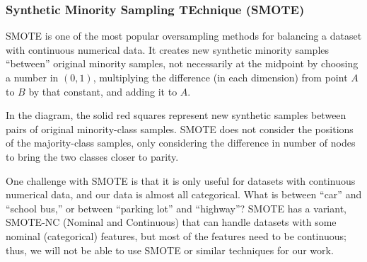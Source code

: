 \subsubsection{Synthetic Minority Sampling TEchnique (SMOTE)}

SMOTE \citep{00017602530000120020101} is one of the most popular oversampling methods for balancing a dataset with continuous numerical data.  It creates new synthetic minority samples ``between'' original minority samples, not necessarily at the midpoint by choosing a number in $(0,1)$, multiplying the difference (in each dimension) from point $A$ to $B$ by that constant, and adding it to $A$.

In the diagram, the solid red squares represent new synthetic samples between pairs of original minority-class samples.  SMOTE does not consider the positions of the majority-class samples, only considering the difference in number of nodes to bring the two classes closer to parity.  

\begin{center}
\end{center}

One challenge with SMOTE is that it is only useful for datasets with continuous numerical data, and our data is almost all categorical.  What is between ``car'' and ``school bus,'' or between ``parking lot'' and ``highway''?  SMOTE has a variant, SMOTE-NC (Nominal and Continuous) that can handle datasets with some nominal (categorical) features, but most of the features need to be continuous; thus, we will not be able to use SMOTE or similar techniques for our work.  


